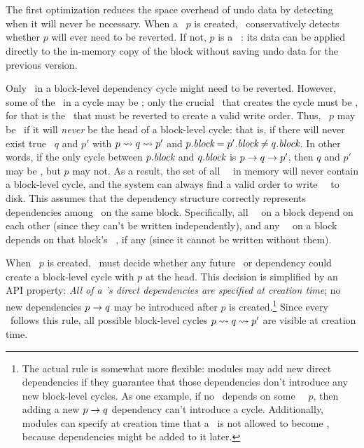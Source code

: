 
\subsection{\Nrb\ \Patches}
\label{sec:patch:nrb}

The first optimization reduces the space overhead of undo data by
detecting when it will never be necessary.
%
When a \patch\ $p$ is created, \Kudos\ conservatively detects whether $p$
will ever need to be reverted.
%
If not, $p$ is a \emph{\nrb\ \patch}: its data can be applied
directly to the in-memory copy of the block without saving undo data
for the previous version.


Only \patches\ in a block-level dependency cycle might need to be reverted.
%
However, some of the \patches\ in a cycle may be \nrb; only the crucial
\patch\ that creates the cycle must be \rb, for that is the \patch\ that
must be reverted to create a valid write order.
%
Thus, \patch\ $p$ may be \nrb\ if it will \emph{never} be the head of a
block-level cycle: that is, if there will never exist true \patches\ $q$
and $p'$ with $p \leadsto q \leadsto p'$ and $p.\textit{block} = p'.\textit{block}
\neq q.\textit{block}$.
%
In other words, if the only cycle between $p.\textit{block}$ and $q.\textit{block}$ is $p
\rightarrow q \rightarrow p'$, then $q$ and $p'$ may be \nrb, but $p$ may
not.
%
As a result, the set of all \nrb\ \patches\ in memory will never contain
a block-level cycle, and the system can always find a valid order to
write \nrb\ \patches\ to disk.
%
This assumes that the dependency structure correctly represents
dependencies among \patches\ on the same block.
%
Specifically, all \nrb\ \patches\ on a block depend on each other (since
they can't be written independently), and any \rb\ \patch\ on a block
depends on that block's \nrb\ \patches, if any (since it cannot be written
without them).


When \patch\ $p$ is created, \Kudos\ must decide whether any future
\patch\ or dependency could create a block-level cycle with $p$ at the
head.
%
This decision is simplified by an API property: \emph{All of a \patch's
direct dependencies are specified at creation time};
%
no new dependencies $p \rightarrow q$ may be introduced after $p$ is
created.\footnote{The actual rule is somewhat more flexible: modules may add
  new direct dependencies if they guarantee that those dependencies
  don't introduce any new block-level cycles.  As one example, if no
  \patch\ depends on some \noop\ \patch\ $p$, then adding a new $p
  \rightarrow q$ dependency can't introduce a cycle.  Additionally,
  modules can specify at creation time that a \patch\ is not allowed to
  become \nrb, because dependencies might be added to it later.}
%
Since every \patch\ follows this rule, all possible block-level cycles $p
\leadsto q \leadsto p'$ are visible at creation time.


